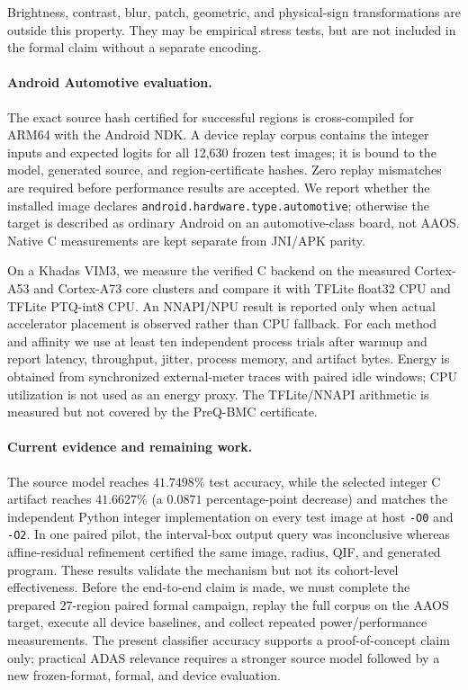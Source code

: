 Brightness, contrast, blur, patch, geometric, and physical-sign transformations
are outside this property.  They may be empirical stress tests, but are not
included in the formal claim without a separate encoding.

\paragraph{Android Automotive evaluation.}
The exact source hash certified for successful regions is cross-compiled for
ARM64 with the Android NDK.  A device replay corpus contains the integer inputs
and expected logits for all 12,630 frozen test images; it is bound to the model,
generated source, and region-certificate hashes.  Zero replay mismatches are
required before performance results are accepted.  We report whether the
installed image declares \texttt{android.hardware.type.automotive}; otherwise
the target is described as ordinary Android on an automotive-class board, not
AAOS.  Native C measurements are kept separate from JNI/APK parity.

On a Khadas VIM3, we measure the verified C backend on the measured Cortex-A53
and Cortex-A73 core clusters and compare it with TFLite float32 CPU and TFLite
PTQ-int8 CPU.  An NNAPI/NPU result is reported only when actual accelerator
placement is observed rather than CPU fallback.  For each method and affinity
we use at least ten independent process trials after warmup and report latency,
throughput, jitter, process memory, and artifact bytes.  Energy is obtained from
synchronized external-meter traces with paired idle windows; CPU utilization is
not used as an energy proxy.  The TFLite/NNAPI arithmetic is measured but not
covered by the PreQ-BMC certificate.

\paragraph{Current evidence and remaining work.}
The source model reaches $41.7498\%$ test accuracy, while the selected integer C
artifact reaches $41.6627\%$ (a $0.0871$ percentage-point decrease) and matches
the independent Python integer implementation on every test image at host
\texttt{-O0} and \texttt{-O2}.  In one paired pilot, the interval-box output
query was inconclusive whereas affine-residual refinement certified the same
image, radius, QIF, and generated program.  These results validate the mechanism
but not its cohort-level effectiveness.  Before the end-to-end claim is made,
we must complete the prepared 27-region paired formal campaign, replay the full
corpus on the AAOS target, execute all device baselines, and collect repeated
power/performance measurements.  The present classifier accuracy supports a
proof-of-concept claim only; practical ADAS relevance requires a stronger source
model followed by a new frozen-format, formal, and device evaluation.
